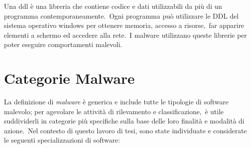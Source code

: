 Una ddl è una libreria che contiene codice e dati utilizzabili da più di un programma contemporaneamente.\
Ogni programma può utilizzare le DDL del sistema operativo windows per ottenere memoria, accesso a risorse,\
far apparire elementi a schermo ed accedere alla rete.\
I malware utilizzano queste librerie per poter eseguire comportamenti malevoli.

\section{Categorie Malware}

La definizione di \textit{malware} è generica e include tutte le tipologie di software malevolo; per agevolare le attività di rilevamento e classificazione,\
è utile suddividerli in categorie più specifiche sulla base delle loro finalità e modalità di azione.\
Nel contesto di questo lavoro di tesi, sono state individuate e considerate le seguenti specializzazioni di software:

